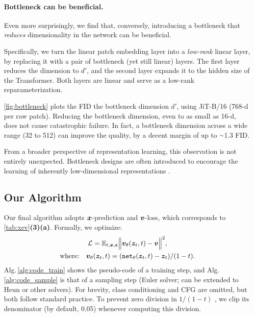 \paragraph{Bottleneck can be beneficial.} Even more surprisingly, we find that, conversely, introducing a bottleneck that \textit{reduces} dimensionality in the network can be beneficial.

Specifically, we turn the linear patch embedding layer into a \textit{low-rank} linear layer, by replacing it with a pair of bottleneck (yet still linear) layers. The first layer reduces the dimension to $d'$, and the second layer expands it to the hidden size of the Transformer. Both layers are linear and serve as a low-rank reparameterization.

\cref{fig:bottleneck} plots the FID \vs the bottleneck dimension $d'$, using JiT-B/16 (768-d per raw patch). Reducing the bottleneck dimension, even to as small as 16-d, does not cause catastrophic failure. In fact, a bottleneck dimension across a wide range (32 to 512) can improve the quality, by a decent margin of up to $\app$1.3 FID. 

From a broader perspective of representation learning, this observation is not entirely unexpected. 
Bottleneck designs are often introduced to encourage the learning of inherently low-dimensional representations \cite{tishby2000information,rifai2011contractive,makhzani2013k,alemi2016deep}.




\subsection{Our Algorithm}

Our final algorithm adopts $\bm{x}$-prediction and $\bm{v}$-loss, which corresponds to \cref{tab:xev}\textbf{(3)(a)}. Formally, we optimize:
\begin{gather}
\mathcal{L} = \mathbb{E}_{t,\bm{x},\bm{\epsilon}} \Big\|  \bm{v}_\theta(\bm{z}_t, t) - \bm{v} \Big\|^2,
\label{eq:objective}
 \\
\text{where:}\quad \bm{v}_\theta(\bm{z}_t, t) =  (\text{\texttt{net}}_\theta(\bm{z}_t, t)-\bm{z}_t) / (1 - t).
\nonumber
\end{gather}
Alg.\,\ref{alg:code_train} shows the pseudo-code of a training step, and Alg.\,\ref{alg:code_sample} is that of a sampling step (Euler solver; can be extended to Heun or other solvers).
For brevity, class conditioning and CFG \cite{ho2022classifier} are omitted, but both follow standard practice.
To prevent zero division in $1{/}(1{-}t)$ , we clip its denominator (by default, 0.05) whenever computing this division.

